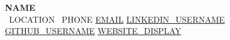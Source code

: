 \begin{center}
    \textbf{\Huge \scshape {{NAME}}} \\ \vspace{1pt}
     \ \small {{LOCATION}} \quad
     \ \small {{PHONE}} \quad
    \href{mailto:{{EMAIL}}}{ {{EMAIL}}} \quad
    \href{{{LINKEDIN_URL}}}{ {{LINKEDIN_USERNAME}}} \quad
    \href{{{GITHUB_URL}}}{ {{GITHUB_USERNAME}}} \quad
    \href{{{WEBSITE}}}{ {{WEBSITE_DISPLAY}}} \quad
\end{center}
